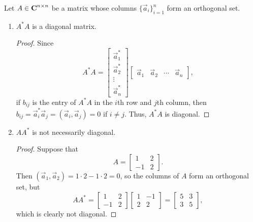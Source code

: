 \documentclass{homework}
\begin{document}
	\question Let $A \in \textnormal{\bf C}^{n\times n}$ be a matrix whose columns $\{\vec{a}_i\}_{i=1}^n$ form an orthogonal set.
	
	\begin{enumerate}
		\item $A^*A$ is a diagonal matrix.
		\begin{proof}
			Since
			\begin{equation*}
				A^*A = \left[\begin{matrix}
					\vec{a}_1^* \\ \vec{a}_2^* \\ \vdots \\ \vec{a}_n^*
				\end{matrix}\right]
				\left[\begin{matrix}
					\vec{a}_1 & \vec{a}_2 & \cdots & \vec{a}_n
				\end{matrix}\right],
			\end{equation*}
			if $b_{ij}$ is the entry of $A^*A$ in the $i$th row and $j$th column, then $b_{ij} = \vec{a}_i^*\vec{a}_j = (\vec{a}_i, \vec{a}_j) = 0$ if $i \ne j$. Thus, $A^*A$ is diagonal.
		\end{proof}
		
		\item $AA^*$ is not necessarily diagonal.
		\begin{proof}
			Suppose that
			\begin{equation*}
				A = \left[\begin{matrix}
					1 & 2 \\
					-1 & 2
				\end{matrix}\right].
			\end{equation*}
			Then $(\vec{a}_1, \vec{a}_2) = 1\cdot 2 - 1\cdot2 = 0$, so the columns of $A$ form an orthogonal set, but
			\begin{equation*}
				AA^* = \left[\begin{matrix}
					1 & 2 \\
					-1 & 2
				\end{matrix}\right]
				\left[\begin{matrix}
					1 & - 1\\
					2 & 2
				\end{matrix}\right] 
				= \left[\begin{matrix}
					5 & 3 \\
					3 & 5
				\end{matrix}\right],
			\end{equation*}
			which is clearly not diagonal.
		\end{proof}
	\end{enumerate}
	
\end{document}

